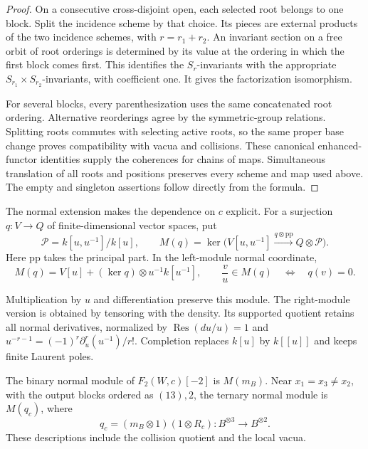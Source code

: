 \begin{proof}
On a consecutive cross-disjoint open, each selected root belongs to
one block. Split the incidence scheme by that choice. Its pieces are
external products of the two incidence schemes, with $r=r_1+r_2$.
An invariant section on a free orbit of root orderings is determined
by its value at the ordering in which the first block comes first.
This identifies the $S_r$-invariants with the appropriate
$S_{r_1}\times S_{r_2}$-invariants, with coefficient one.
It gives the factorization isomorphism.

For several blocks, every parenthesization uses the same concatenated
root ordering. Alternative reorderings agree by the symmetric-group
relations. Splitting roots commutes with selecting active roots, so
the same proper base change proves compatibility with vacua and
collisions. These canonical enhanced-functor identities supply the
coherences for chains of maps. Simultaneous translation of all roots
and positions preserves every scheme and map used above. The empty
and singleton assertions follow directly from the formula.
\end{proof}

The normal extension makes the dependence on $c$ explicit. For a
surjection $q:V\to Q$ of finite-dimensional vector spaces, put
\[
 \mathcal P=k[u,u^{-1}]/k[u],\qquad
 M(q)=\ker\bigl(V[u,u^{-1}]\xrightarrow{q\otimes\mathrm{pp}}
                                      Q\otimes\mathcal P\bigr).
\]
Here $\mathrm{pp}$ takes the principal part. In the left-module
normal coordinate,
\begin{equation}\label{cycmp:eq:normal-lattice}
 M(q)=V[u]+(\ker q)\otimes u^{-1}k[u^{-1}],
 \qquad \frac vu\in M(q)\quad\Longleftrightarrow\quad q(v)=0.
\end{equation}

Multiplication by $u$ and differentiation preserve this module.
The right-module version is obtained by tensoring with the density.
Its supported quotient retains all normal derivatives, normalized by
$\operatorname{Res}(du/u)=1$ and
$u^{-r-1}=(-1)^r\partial_u^r(u^{-1})/r!$.
Completion replaces $k[u]$ by $k[[u]]$ and keeps finite Laurent poles.

\begin{lemma}\label{cycmp:lem:particle-lattices}
The binary normal module of $F_2(W,c)[-2]$ is $M(m_B)$.
Near $x_1=x_3\ne x_2$, with the output blocks ordered as $(13),2$,
the ternary normal module is $M(q_c)$, where
\begin{equation}\label{cycmp:eq:particle-outer}
 q_c=(m_B\otimes1)(1\otimes R_c):B^{\otimes3}\longrightarrow B^{\otimes2}.
\end{equation}
These descriptions include the collision quotient and the local vacua.
\end{lemma}

